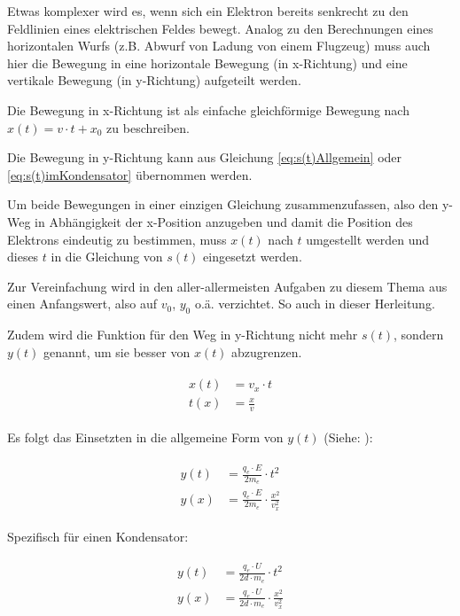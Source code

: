 Etwas komplexer wird es, wenn sich ein Elektron bereits senkrecht zu den Feldlinien eines elektrischen Feldes bewegt. Analog zu den Berechnungen eines horizontalen Wurfs (z.B. Abwurf von Ladung von einem Flugzeug) muss auch hier die Bewegung in eine horizontale Bewegung (\glqq in x-Richtung\grqq) und eine vertikale Bewegung (\glqq in y-Richtung\grqq) aufgeteilt werden. 

Die Bewegung in x-Richtung ist als einfache gleichförmige Bewegung nach $x(t)=v \cdot t + x_0$ zu beschreiben. 

Die Bewegung in y-Richtung kann aus Gleichung \ref{eq:s(t)Allgemein} oder \ref{eq:s(t)imKondensator} übernommen werden.

Um beide Bewegungen in einer einzigen Gleichung zusammenzufassen, also den y-Weg in Abhängigkeit der x-Position anzugeben und damit die Position des Elektrons eindeutig zu bestimmen, muss $x(t)$ nach $t$ umgestellt werden und dieses $t$ in die Gleichung von $s(t)$ eingesetzt werden. 

\begin{NiceToKnow}
Zur Vereinfachung wird in den aller-allermeisten Aufgaben zu diesem Thema aus einen Anfangswert, also auf $v_0$, $y_0$ o.ä. verzichtet. So auch in dieser Herleitung.
\end{NiceToKnow}

Zudem wird die Funktion für den Weg in y-Richtung nicht mehr $s(t)$, sondern $y(t)$ genannt, um sie besser von $x(t)$ abzugrenzen.

\begin{align} \label{eq:x(t)Senkrecht}
\begin{split}
	x(t) &= v_x \cdot t \\
	t(x) &= \frac{x}{v}
\end{split}
\end{align}

\noindent Es folgt das Einsetzten in die allgemeine Form von $y(t)$ (Siehe: ):

\begin{align} \label{eq:y(x)Allgemein}
\begin{split}
	y(t) &= \frac{q_e \cdot E}{2m_e} \cdot t^2 \\
	y(x) &= \frac{q_e \cdot E}{2m_e} \cdot \frac{x^2}{v_{x}^2}
\end{split}
\end{align}

\noindent Spezifisch für einen Kondensator:

\begin{align} \label{eq:y(x)imKondensator}
\begin{split}
	y(t) &= \frac{q_e \cdot U}{2d \cdot m_e} \cdot t^2 \\
	y(x) &= \frac{q_e \cdot U}{2d \cdot m_e} \cdot \frac{x^2}{v_{x}^2}
\end{split}
\end{align}





